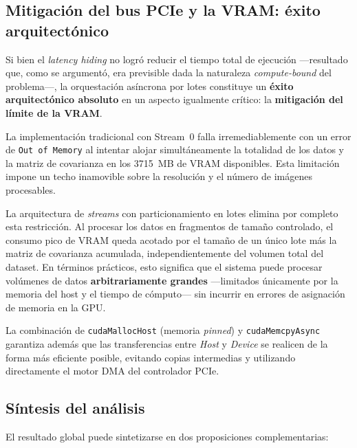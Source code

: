 \documentclass[12pt, a4paper]{article}
\begin{document}
\subsection{Mitigación del bus PCIe y la VRAM: éxito arquitectónico}

Si bien el \textit{latency hiding} no logró reducir el tiempo total de
ejecución ---resultado que, como se argumentó, era previsible dada la
naturaleza \textit{compute-bound} del problema---, la orquestación asíncrona
por lotes constituye un \textbf{éxito arquitectónico absoluto} en un aspecto
igualmente crítico: la \textbf{mitigación del límite de la VRAM}.

La implementación tradicional con Stream~0 falla irremediablemente con un
error de \texttt{Out of Memory} al intentar alojar simultáneamente la totalidad
de los datos y la matriz de covarianza en los 3715~MB de VRAM disponibles.
Esta limitación impone un techo inamovible sobre la resolución y el número de
imágenes procesables.

La arquitectura de \textit{streams} con particionamiento en lotes elimina por
completo esta restricción. Al procesar los datos en fragmentos de tamaño
controlado, el consumo pico de VRAM queda acotado por el tamaño de un único
lote más la matriz de covarianza acumulada, independientemente del volumen
total del dataset. En términos prácticos, esto significa que el sistema puede
procesar volúmenes de datos \textbf{arbitrariamente grandes} ---limitados
únicamente por la memoria del host y el tiempo de cómputo--- sin incurrir en
errores de asignación de memoria en la GPU.

La combinación de \texttt{cudaMallocHost} (memoria \textit{pinned}) y
\texttt{cudaMemcpyAsync} garantiza además que las transferencias entre
\textit{Host} y \textit{Device} se realicen de la forma más eficiente posible,
evitando copias intermedias y utilizando directamente el motor DMA del
controlador PCIe.

\subsection{Síntesis del análisis}

El resultado global puede sintetizarse en dos proposiciones complementarias:
\end{document}
